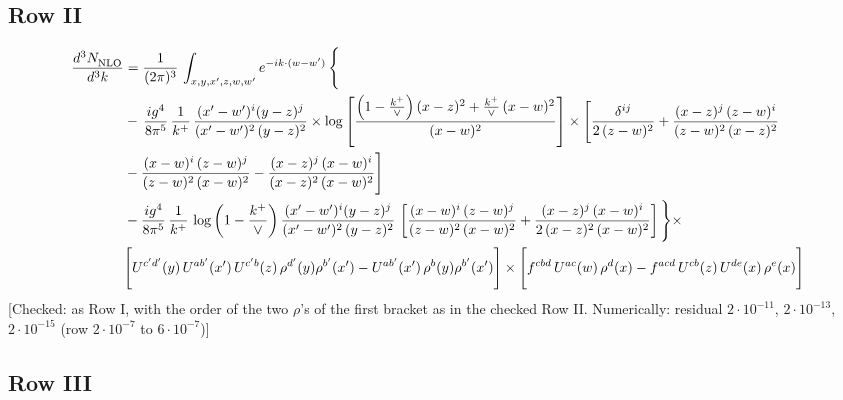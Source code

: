 \documentclass[9pt]{article}
\numberwithin{equation}{section}
\begin{document}
\subsection{Row II}
\begin{align}
     \frac{d^{3}N_{\rm NLO}^{\rm}}{d^{3}k}  & =   \frac{1}{(2\pi)^{3}}\, \int_{x,y,x',z,w,w^{\prime}} e^{-ik\cdot (w-w')}\, \Bigg\{\notag \\
& -\,\frac{ig^{4}}{8\pi^{5}}\,\frac{1}{k^{+}}\,\frac{(x'-w')^{i}(y-z)^{j}}{(x'-w')^{2}\,(y-z)^{2}}\times \log{\left[\frac{\left(1-\frac{k^{+}}{\vee}\right)(x-z)^{2}+\frac{k^{+}}{\vee}\,(x-w)^{2}}{(x-w)^{2}}\right]}\times \Bigg[\frac{\delta^{ij}}{2\,(z-w)^{2}}+\frac{(x-z)^{j}\,(z-w)^{i}}{(z-w)^{2}\,(x-z)^{2}}\notag \\ & -\frac{(x-w)^{i}\,(z-w)^{j}}{(z-w)^{2}\,(x-w)^{2}}-\frac{(x-z)^{j}\,(x-w)^{i}}{(x-z)^{2}\,(x-w)^{2}}\Bigg] \notag \\
& -\frac{ig^{4}}{8\pi^{5}}\,\frac{1}{k^{+}}\,\log{\left(1-\frac{k^{+}}{\vee}\right)}\,\frac{(x'-w')^{i}(y-z)^{j}}{(x'-w')^{2}\,(y-z)^{2}}\,\left[\frac{(x-w)^{i}\,(z-w)^{j}}{(z-w)^{2}\,(x-w)^{2}}+\frac{(x-z)^{j}\,(x-w)^{i}}{2\,(x-z)^{2}\, (x-w)^{2}}\right]\Bigg\}\times \notag \\ & \Bigg[U^{c'd'}(y)\,U^{ab'}(x')\,U^{c'b}(z)\,\rho^{d'}(y)\rho^{b'}(x')-U^{ab'}(x')\,\rho^{b}(y)\rho^{b'}(x')\Bigg]\times\Bigg[f^{cbd}\,U^{ac}(w)\,\rho^{d}(x)-f^{acd}\, U^{cb}(z)\,U^{de}(x)\,\rho^{e}(x)\Bigg]
\end{align} {\color{red}[Checked: as Row I, with the order of the two $\rho$'s of the first bracket as in the checked Row II. Numerically: residual $2\cdot10^{-11}$, $2\cdot10^{-13}$, $2\cdot10^{-15}$ (row $2\cdot10^{-7}$ to $6\cdot10^{-7}$)]}\par\noindent
 \subsection{Row III}
\end{document}
